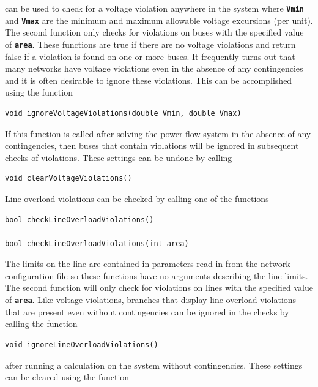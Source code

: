 \documentclass[12pt]{report} %
\begin{document}
can be used to check for a voltage violation anywhere in the system where \texttt{\textbf{Vmin}} and \texttt{\textbf{Vmax}} are the minimum and maximum allowable voltage excursions (per unit). The second function only checks for violations on buses with the specified value of \texttt{\textbf{area}}. These functions are true if there are no voltage violations and return false if a violation is found on one or more buses. It frequently turns out that many networks have voltage violations even in the absence of any contingencies and it is often desirable to ignore these violations. This can be accomplished using the function

{
\color{red}
\begin{Verbatim}[fontseries=b]
void ignoreVoltageViolations(double Vmin, double Vmax)
\end{Verbatim}
}

If this function is called after solving the power flow system in the absence of any contingencies, then buses that contain violations will be ignored in subsequent checks of violations. These settings can be undone by calling

{
\color{red}
\begin{Verbatim}[fontseries=b]
void clearVoltageViolations()
\end{Verbatim}
}

Line overload violations can be checked by calling one of the functions

{
\color{red}
\begin{Verbatim}[fontseries=b]
bool checkLineOverloadViolations()

bool checkLineOverloadViolations(int area)
\end{Verbatim}
}

The limits on the line are contained in parameters read in from the network configuration file so these functions have no arguments describing the line limits. The second function will only check for violations on lines with the specified value of \texttt{\textbf{area}}. Like voltage violations, branches that display line overload violations that are present even without contingencies can be ignored in the checks by calling the function

{
\color{red}
\begin{Verbatim}[fontseries=b]
void ignoreLineOverloadViolations()
\end{Verbatim}
}

after running a calculation on the system without contingencies. These settings can be cleared using the function
\end{document}
